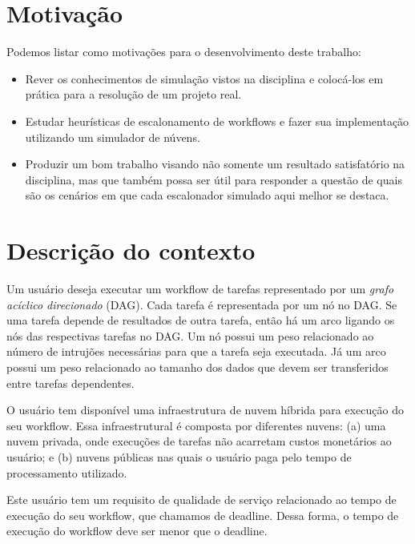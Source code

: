 \documentclass[a4paper,10pt]{article}
\begin{document}
\section{Motivação}

Podemos listar como motivações para o desenvolvimento deste trabalho:\\

\begin{itemize}

\item Rever os conhecimentos de simulação vistos na disciplina e colocá-los em prática para a resolução de um projeto real.

\item Estudar heurísticas de escalonamento de workflows e fazer sua implementação utilizando um simulador de núvens.

\item Produzir um bom trabalho visando não somente um resultado satisfatório na disciplina, mas que também possa ser útil
para responder a questão de quais são os cenários em que cada escalonador simulado aqui melhor se destaca.

\end{itemize}

\section{Descrição do contexto}

Um usuário deseja executar um workflow de tarefas representado por um \emph{grafo acíclico 
direcionado} (DAG). Cada tarefa é representada por um nó no DAG. Se uma tarefa depende de
resultados de outra tarefa, então há um arco ligando os nós das respectivas tarefas no DAG.
Um nó possui um peso relacionado ao número de intrujões necessárias para que a tarefa seja executada.
Já um arco possui um peso relacionado ao tamanho dos dados que devem ser transferidos entre tarefas
dependentes.

O usuário tem disponível uma infraestrutura de nuvem híbrida para execução do 
seu workflow. Essa infraestrutural é composta por diferentes nuvens: (a) uma nuvem 
privada, onde execuções de tarefas não acarretam custos monetários ao usuário; e (b) 
nuvens públicas nas quais o usuário paga pelo tempo de processamento utilizado.

Este usuário tem um requisito de qualidade de serviço relacionado 
ao tempo de execução do seu workflow, que chamamos de deadline. Dessa forma, o tempo 
de execução do workflow deve ser menor que o deadline.
\end{document}
